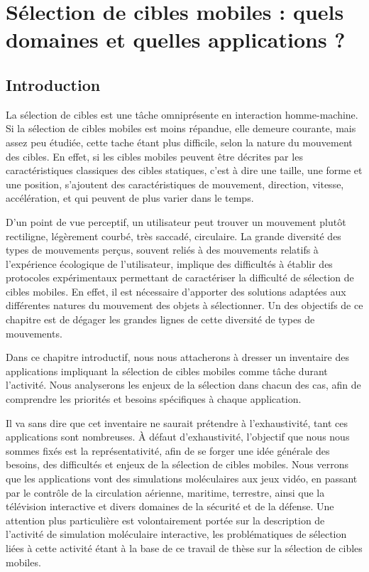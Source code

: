 
\chapter[Sélection de cibles mobiles : applications]{Sélection de cibles mobiles : quels domaines et quelles applications ?}

\minitoc
\label{chap1}
\cleardoublepage

	\section{Introduction}
	La sélection de cibles est une tâche omniprésente en interaction homme-machine. Si la sélection de cibles mobiles est moins répandue, elle demeure courante, mais assez peu étudiée, cette tache étant plus difficile, selon la nature du mouvement des cibles. En effet, si les cibles mobiles peuvent être décrites par les caractéristiques classiques des cibles statiques, c'est à dire une taille, une forme et une position, s'ajoutent des caractéristiques de mouvement, direction, vitesse,  accélération, et qui peuvent de plus varier dans le temps. 
	
	D'un point de vue perceptif, un utilisateur peut trouver un mouvement plutôt rectiligne, légèrement courbé, très saccadé, circulaire. La grande diversité des types de mouvements perçus, souvent reliés à des mouvements relatifs à l'expérience écologique de l'utilisateur, implique des difficultés à établir  des protocoles expérimentaux permettant de caractériser la difficulté de sélection de cibles mobiles. En effet, il est nécessaire d'apporter des solutions  adaptées aux différentes natures du mouvement des objets à sélectionner. Un des objectifs de ce chapitre est de dégager les grandes lignes de cette diversité de types de mouvements.
	
	Dans ce chapitre introductif, nous nous attacherons à dresser un inventaire des applications impliquant la sélection de cibles mobiles comme tâche durant l'activité. Nous analyserons les enjeux de la sélection dans chacun des cas, afin de comprendre les priorités et besoins spécifiques à chaque application.
	
	Il va sans dire que cet inventaire ne saurait prétendre à l'exhaustivité, tant ces applications sont nombreuses. À défaut d'exhaustivité, l'objectif que nous nous sommes fixés est la représentativité, afin de se forger une idée générale des besoins, des difficultés et enjeux de la sélection de cibles mobiles. Nous verrons que les applications vont des simulations moléculaires aux jeux vidéo, en passant par le contrôle de la circulation aérienne, maritime, terrestre, ainsi que la télévision interactive et divers domaines de la sécurité et de la défense. Une attention plus particulière est volontairement portée sur la description de l'activité de simulation moléculaire interactive, les problématiques de sélection liées à cette activité étant à la base de ce travail de thèse sur la sélection de cibles mobiles.
	

